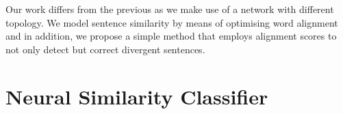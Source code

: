 \documentclass[11pt,a4paper]{article}
\begin{document}
Our work differs from the previous as we make use of a network with different topology. 
We model sentence similarity by means of optimising word alignment and in addition, we propose a simple method that employs alignment scores to not only detect but correct divergent sentences.


\section{Neural Similarity Classifier}
\label{sec:similarity}
\end{document}

